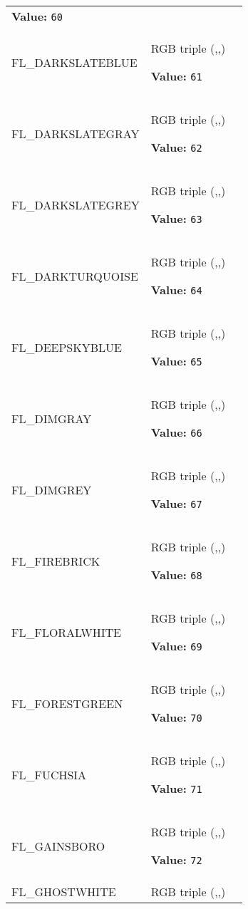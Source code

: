 \begin{longtable}{|p{\varnamewidth}|p{\vardescrwidth}|l}
\textbf{Value:} 
{\tt 60}&\\
\cline{1-2}
\raggedright F\-L\-\_\-D\-A\-R\-K\-S\-L\-A\-T\-E\-B\-L\-U\-E\- & \raggedright RGB triple (,,)

\textbf{Value:} 
{\tt 61}&\\
\cline{1-2}
\raggedright F\-L\-\_\-D\-A\-R\-K\-S\-L\-A\-T\-E\-G\-R\-A\-Y\- & \raggedright RGB triple (,,)

\textbf{Value:} 
{\tt 62}&\\
\cline{1-2}
\raggedright F\-L\-\_\-D\-A\-R\-K\-S\-L\-A\-T\-E\-G\-R\-E\-Y\- & \raggedright RGB triple (,,)

\textbf{Value:} 
{\tt 63}&\\
\cline{1-2}
\raggedright F\-L\-\_\-D\-A\-R\-K\-T\-U\-R\-Q\-U\-O\-I\-S\-E\- & \raggedright RGB triple (,,)

\textbf{Value:} 
{\tt 64}&\\
\cline{1-2}
\raggedright F\-L\-\_\-D\-E\-E\-P\-S\-K\-Y\-B\-L\-U\-E\- & \raggedright RGB triple (,,)

\textbf{Value:} 
{\tt 65}&\\
\cline{1-2}
\raggedright F\-L\-\_\-D\-I\-M\-G\-R\-A\-Y\- & \raggedright RGB triple (,,)

\textbf{Value:} 
{\tt 66}&\\
\cline{1-2}
\raggedright F\-L\-\_\-D\-I\-M\-G\-R\-E\-Y\- & \raggedright RGB triple (,,)

\textbf{Value:} 
{\tt 67}&\\
\cline{1-2}
\raggedright F\-L\-\_\-F\-I\-R\-E\-B\-R\-I\-C\-K\- & \raggedright RGB triple (,,)

\textbf{Value:} 
{\tt 68}&\\
\cline{1-2}
\raggedright F\-L\-\_\-F\-L\-O\-R\-A\-L\-W\-H\-I\-T\-E\- & \raggedright RGB triple (,,)

\textbf{Value:} 
{\tt 69}&\\
\cline{1-2}
\raggedright F\-L\-\_\-F\-O\-R\-E\-S\-T\-G\-R\-E\-E\-N\- & \raggedright RGB triple (,,)

\textbf{Value:} 
{\tt 70}&\\
\cline{1-2}
\raggedright F\-L\-\_\-F\-U\-C\-H\-S\-I\-A\- & \raggedright RGB triple (,,)

\textbf{Value:} 
{\tt 71}&\\
\cline{1-2}
\raggedright F\-L\-\_\-G\-A\-I\-N\-S\-B\-O\-R\-O\- & \raggedright RGB triple (,,)

\textbf{Value:} 
{\tt 72}&\\
\cline{1-2}
\raggedright F\-L\-\_\-G\-H\-O\-S\-T\-W\-H\-I\-T\-E\- & \raggedright RGB triple (,,)


\end{longtable}
